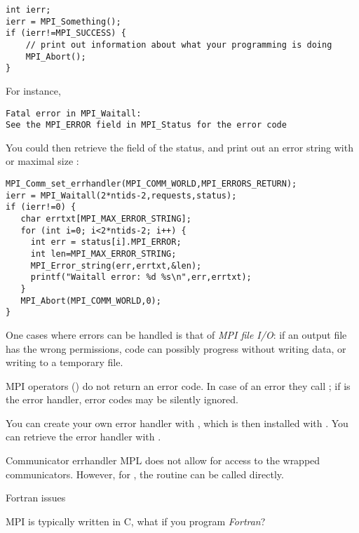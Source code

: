\begin{lstlisting}
int ierr;
ierr = MPI_Something();
if (ierr!=MPI_SUCCESS) {
    // print out information about what your programming is doing
    MPI_Abort();
}
\end{lstlisting}
For instance,
\begin{verbatim}
Fatal error in MPI_Waitall: 
See the MPI_ERROR field in MPI_Status for the error code
\end{verbatim}
You could then retrieve the  field of the
status, and print out an error string with
or maximal size :
\begin{lstlisting}
MPI_Comm_set_errhandler(MPI_COMM_WORLD,MPI_ERRORS_RETURN);
ierr = MPI_Waitall(2*ntids-2,requests,status);
if (ierr!=0) {
   char errtxt[MPI_MAX_ERROR_STRING];
   for (int i=0; i<2*ntids-2; i++) {
     int err = status[i].MPI_ERROR;
     int len=MPI_MAX_ERROR_STRING;
     MPI_Error_string(err,errtxt,&len);
     printf("Waitall error: %d %s\n",err,errtxt);
   }
   MPI_Abort(MPI_COMM_WORLD,0);
}
\end{lstlisting}
One cases where errors can be handled is that of \emph{MPI file
  I/O}: if an output file has the wrong
permissions, code can possibly progress without writing data, or
writing to a temporary file.

MPI operators () do not return an error code. In case of
an error they call ; if 
is the error handler, error codes may be silently ignored.

You can create your own error handler with
, which is then installed with
. You can retrieve the error
handler with .

\begin{mplnote}{Communicator errhandler}
  \ac{MPL} does not allow for access to the wrapped communicators.
  However, for , the routine
  can be called directly.
\end{mplnote}

 {Fortran issues}
\label{sec:mpi-fortran}

MPI is typically written in C, what if you program \emph{Fortran}?

